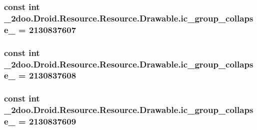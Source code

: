 \hypertarget{class__2doo_1_1_droid_1_1_resource_1_1_drawable_94430c92dc61579e10c58f662b6d4bc2}{
\subsubsection[{ic\_\-group\_\-collapse\_\-08}]{\setlength{\rightskip}{0pt plus 5cm}const int \_\-2doo.Droid.Resource.Resource.Drawable.ic\_\-group\_\-collapse\_ = 2130837607}}
\label{class__2doo_1_1_droid_1_1_resource_1_1_drawable_94430c92dc61579e10c58f662b6d4bc2}


\hypertarget{class__2doo_1_1_droid_1_1_resource_1_1_drawable_876dee7cb256e78fd5b54e8e8a15ca17}{
\subsubsection[{ic\_\-group\_\-collapse\_\-09}]{\setlength{\rightskip}{0pt plus 5cm}const int \_\-2doo.Droid.Resource.Resource.Drawable.ic\_\-group\_\-collapse\_ = 2130837608}}
\label{class__2doo_1_1_droid_1_1_resource_1_1_drawable_876dee7cb256e78fd5b54e8e8a15ca17}


\hypertarget{class__2doo_1_1_droid_1_1_resource_1_1_drawable_1a4c3cc2309259f321e8be3b5bd7b405}{
\subsubsection[{ic\_\-group\_\-collapse\_\-10}]{\setlength{\rightskip}{0pt plus 5cm}const int \_\-2doo.Droid.Resource.Resource.Drawable.ic\_\-group\_\-collapse\_ = 2130837609}}
\label{class__2doo_1_1_droid_1_1_resource_1_1_drawable_1a4c3cc2309259f321e8be3b5bd7b405}


